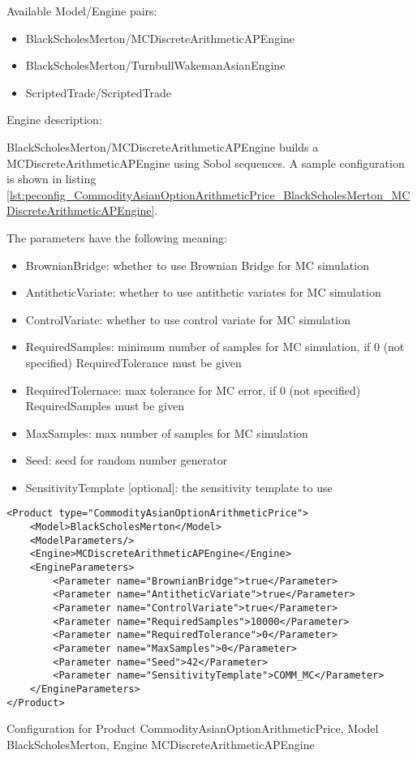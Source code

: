 Available Model/Engine pairs:

\begin{itemize}
  \item BlackScholesMerton/MCDiscreteArithmeticAPEngine
  \item BlackScholesMerton/TurnbullWakemanAsianEngine
  \item ScriptedTrade/ScriptedTrade
\end{itemize}

Engine description:

BlackScholesMerton/MCDiscreteArithmeticAPEngine builds a MCDiscreteArithmeticAPEngine using Sobol sequences. A sample
configuration is shown in listing
\ref{lst:peconfig_CommodityAsianOptionArithmeticPrice_BlackScholesMerton_MCDiscreteArithmeticAPEngine}.

The parameters have the following meaning:

\begin{itemize}
\item BrownianBridge: whether to use Brownian Bridge for MC simulation
\item AntitheticVariate: whether to use antithetic variates for MC simulation
\item ControlVariate: whether to use control variate for MC simulation
\item RequiredSamples: minimum number of samples for MC simulation, if 0 (not specified) RequiredTolerance must be given
\item RequiredTolernace: max tolerance for MC error, if 0 (not specified) RequiredSamples must be given
\item MaxSamples: max number of samples for MC simulation
\item Seed: seed for random number generator
\item SensitivityTemplate [optional]: the sensitivity template to use 
\end{itemize}

\begin{longlisting}
\begin{verbatim}
<Product type="CommodityAsianOptionArithmeticPrice">
    <Model>BlackScholesMerton</Model>
    <ModelParameters/>
    <Engine>MCDiscreteArithmeticAPEngine</Engine>
    <EngineParameters>
        <Parameter name="BrownianBridge">true</Parameter>    
        <Parameter name="AntitheticVariate">true</Parameter>    
        <Parameter name="ControlVariate">true</Parameter>    
        <Parameter name="RequiredSamples">10000</Parameter>    
        <Parameter name="RequiredTolerance">0</Parameter>    
        <Parameter name="MaxSamples">0</Parameter>    
        <Parameter name="Seed">42</Parameter>    
        <Parameter name="SensitivityTemplate">COMM_MC</Parameter>
    </EngineParameters>
</Product>
\end{verbatim}
\caption{Configuration for Product CommodityAsianOptionArithmeticPrice, Model BlackScholesMerton, Engine MCDiscreteArithmeticAPEngine}
\label{lst:peconfig_CommodityAsianOptionArithmeticPrice_BlackScholesMerton_MCDiscreteArithmeticAPEngine}
\end{longlisting}

